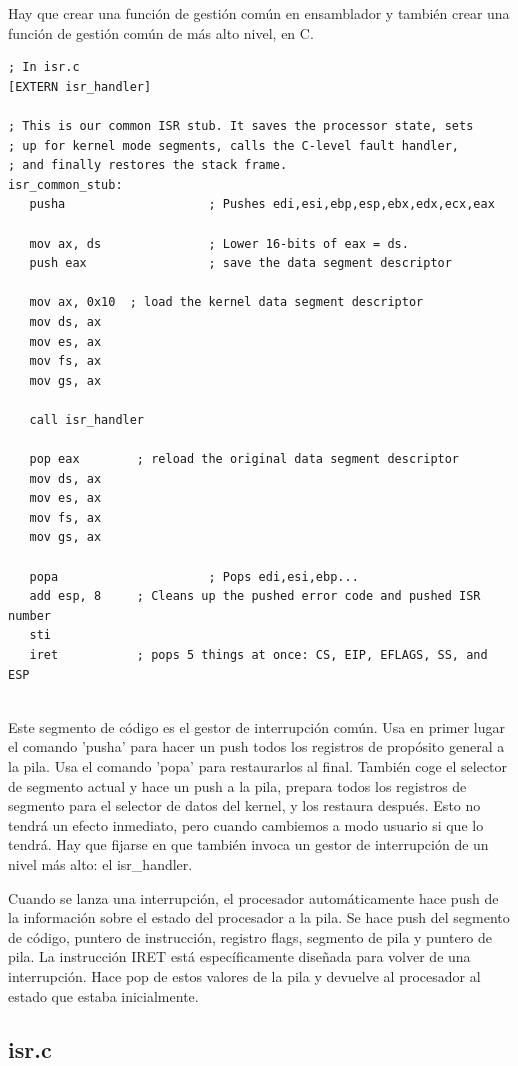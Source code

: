 \documentclass{report}
\begin{document}
Hay que crear una función de gestión común en ensamblador y también crear una función de gestión común de más alto nivel, en C.

\begin{lstlisting}
; In isr.c
[EXTERN isr_handler]

; This is our common ISR stub. It saves the processor state, sets
; up for kernel mode segments, calls the C-level fault handler,
; and finally restores the stack frame.
isr_common_stub:
   pusha                    ; Pushes edi,esi,ebp,esp,ebx,edx,ecx,eax

   mov ax, ds               ; Lower 16-bits of eax = ds.
   push eax                 ; save the data segment descriptor

   mov ax, 0x10  ; load the kernel data segment descriptor
   mov ds, ax
   mov es, ax
   mov fs, ax
   mov gs, ax

   call isr_handler

   pop eax        ; reload the original data segment descriptor
   mov ds, ax
   mov es, ax
   mov fs, ax
   mov gs, ax

   popa                     ; Pops edi,esi,ebp...
   add esp, 8     ; Cleans up the pushed error code and pushed ISR number
   sti
   iret           ; pops 5 things at once: CS, EIP, EFLAGS, SS, and ESP
   
\end{lstlisting}


Este segmento de código es el gestor de interrupción común. Usa en primer lugar el comando 'pusha' para hacer un push todos los registros de propósito general a la pila. Usa el comando 'popa' para restaurarlos al final. También coge el selector de segmento actual y hace un push a la pila, prepara todos los registros de segmento para el selector de datos del kernel, y los restaura después. Esto no tendrá un efecto inmediato, pero cuando cambiemos a modo usuario si que lo tendrá. Hay que fijarse en que también invoca un gestor de interrupción de un nivel más alto: el isr\_handler.

Cuando se lanza una interrupción, el procesador automáticamente hace push de la información sobre el estado del procesador a la pila. Se hace push del segmento de código, puntero de instrucción, registro flags, segmento de pila y puntero de pila. La instrucción IRET está específicamente diseñada para volver de una interrupción. Hace pop de estos valores de la pila y devuelve al procesador al estado que estaba inicialmente.

\subsection{isr.c}
\end{document}
